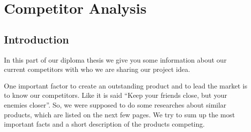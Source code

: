 \chapter{Competitor Analysis}
\section{Introduction}
In this part of our diploma thesis we give you some information about our current competitors with who we are sharing our project idea.

One important factor to create an outstanding product and to lead the market is to know our competitors. Like it is said “Keep your friends close, but your enemies closer”. So,  we were supposed to do some researches about similar products, which are listed on the next few pages. We try to sum up the most important facts and a short description of the products competing. 

